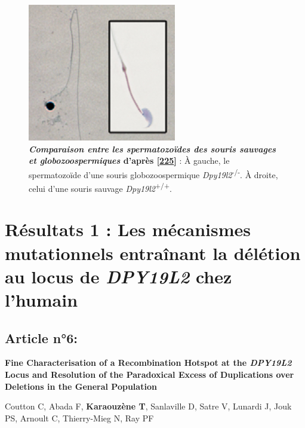 \documentclass[12pt,a4paper,twoside]{ugathesis}
\theoremstyle{definition}
\theoremstyle{definition}
\theoremstyle{definition}
\theoremstyle{remark}
\begin{document}
\begin{figure}

{\centering \includegraphics[scale=.9]{figure/mouse_globo_spz} 

}

\caption[Comparaison entre les spermatozoïdes des
souris sauvages et globozoospermiques]{\textbf{\emph{Comparaison entre les spermatozoïdes
des souris sauvages et globozoospermiques} d'après
{[}\protect\hyperlink{ref-Pierre2012}{225}{]}} : À gauche, le
spermatozoïde d'une souris globozoospermique
\emph{Dpy19l2}\textsuperscript{-/-}. À droite, celui d'une souris
sauvage \emph{Dpy19l2}\textsuperscript{+/+}.\\}\label{fig:pictmouseglobo}
\end{figure}










\newpage

\section{\texorpdfstring{Résultats 1 : Les mécanismes mutationnels
entraînant la délétion au locus de \emph{DPY19L2} chez
l'humain}{Résultats 1 : Les mécanismes mutationnels entraînant la délétion au locus de DPY19L2 chez l'humain}}\label{mecamut}

\subsection{Article n°6:}\label{article-n6}

\textbf{Fine Characterisation of a Recombination Hotspot at the
\emph{DPY19L2} Locus and Resolution of the Paradoxical Excess of
Duplications over Deletions in the General Population}

Coutton C, Abada F, \textbf{Karaouzène T}, Sanlaville D, Satre V,
Lunardi J, Jouk PS, Arnoult C, Thierry-Mieg N, Ray PF
\end{document}
